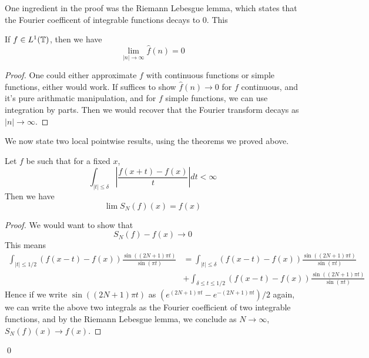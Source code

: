 One ingredient in the proof was the Riemann Lebesgue lemma, which states that the Fourier coefficent of integrable functions decays to 0. This 
\begin{lemma}
    If $f\in L^1(\mathbb{T})$, then we have
    \begin{equation*}
        \lim_{|n|\to\infty}\hat{f}(n)=0
    \end{equation*}
\end{lemma}
\begin{proof}
    One could either approximate $f$ with continuous functions or simple functions, either would work. If suffices to show $\hat{f}(n)\to 0$ for $f$ continuous, and it's pure arithmatic manipulation, and for $f$ simple functions, we can use integration by parts. Then we would recover that the Fourier transform decays as $|n|\to\infty$.
\end{proof}

We now state two local pointwise results, using the theorems we proved above.

\begin{theorem}
    Let $f$ be such that for a fixed $x$,
    \begin{equation*}
        \int_{|t|\leq\delta}\left|\frac{f(x+t)-f(x)}{t} \right|dt<\infty
    \end{equation*}
    Then we have
    \begin{equation*}
        \lim S_N(f)(x)=f(x)
    \end{equation*}
\end{theorem}
\begin{proof}
    We would want to show that 
    \begin{equation*}
        S_N(f)-f(x)\to 0
    \end{equation*}
    This means
    \begin{align*}
        \int_{|t|\leq1/2}(f(x-t)-f(x))\frac{\sin((2N+1)\pi t)}{\sin(\pi t)}&=\int_{|t|\leq\delta}(f(x-t)-f(x))\frac{\sin((2N+1)\pi t)}{\sin(\pi t)}\\
        &+\int_{\delta\leq t\leq1/2}(f(x-t)-f(x))\frac{\sin((2N+1)\pi t)}{\sin(\pi t)}
    \end{align*}
    Hence if we write $\sin((2N+1)\pi t)$ as $(e^{(2N+1)\pi t}-e^{-(2N+1)\pi t})/2$ again, we can write the above two integrals as the Fourier coefficient of two integrable functions, and by the Riemann Lebesgue lemma, we conclude as $N\to\infty$, $S_N(f)(x)\to f(x)$.
\end{proof}
\qed

